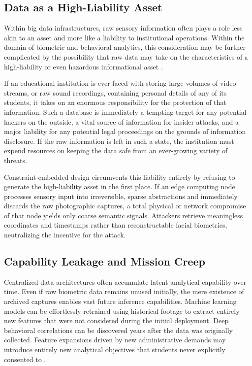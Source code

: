 \documentclass[conference]{IEEEtran}
\begin{document}
\subsection{Data as a High-Liability Asset}
Within big data infrastructures, raw sensory information often plays a role less akin to an asset and more like a liability to institutional operations. Within the domain of biometric and behavioral analytics, this consideration may be further complicated by the possibility that raw data may take on the characteristics of a high-liability or even hazardous informational asset \cite{b9}.

If an educational institution is ever faced with storing large volumes of video streams, or raw sound recordings, containing personal details of any of its students, it takes on an enormous responsibility for the protection of that information. Such a database is immediately a tempting target for any potential hackers on the outside, a vital source of information for insider attacks, and a major liability for any potential legal proceedings on the grounds of information disclosure. If the raw information is left in such a state, the institution must expend resources on keeping the data safe from an ever-growing variety of threats.

Constraint-embedded design circumvents this liability entirely by refusing to generate the high-liability asset in the first place. If an edge computing node processes sensory input into irreversible, sparse abstractions and immediately discards the raw photographic captures, a total physical or network compromise of that node yields only coarse semantic signals. Attackers retrieve meaningless coordinates and timestamps rather than reconstructable facial biometrics, neutralizing the incentive for the attack.

\subsection{Capability Leakage and Mission Creep}
Centralized data architectures often accumulate latent analytical capability over time. Even if raw biometric data remains unused initially, the mere existence of archived captures enables vast future inference capabilities. Machine learning models can be effortlessly retrained using historical footage to extract entirely new features that were not considered during the initial deployment. Deep behavioral correlations can be discovered years after the data was originally collected. Feature expansions driven by new administrative demands may introduce entirely new analytical objectives that students never explicitly consented to \cite{b12}.
\end{document}
